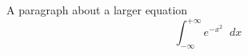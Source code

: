 \documentclass{article}
\newcommand{\diff}{\mathop{}\!d}
\begin{document}
A paragraph about a larger equation
\[
\int_{-\infty}^{+\infty} e^{-x^2} \diff x
\]
\end{document}
